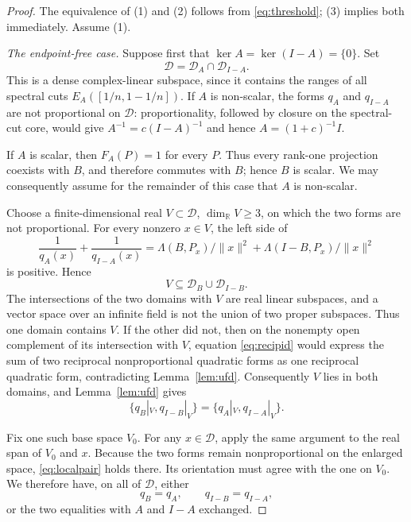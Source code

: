 \documentclass[11pt]{article}
\begin{document}
\begin{proof}
The equivalence of (1) and (2) follows from \eqref{eq:threshold}; (3) implies both immediately.  Assume (1).

\smallskip
\noindent\emph{The endpoint-free case.}
Suppose first that $\ker A=\ker(I-A)=\{0\}$.  Set
\[
 \mathcal D=\mathcal D_A\cap\mathcal D_{I-A}.
\]
This is a dense complex-linear subspace, since it contains the ranges of all spectral cuts $E_A([1/n,1-1/n])$.  If $A$ is non-scalar, the forms $q_A$ and $q_{I-A}$ are not proportional on $\mathcal D$: proportionality, followed by closure on the spectral-cut core, would give $A^{-1}=c(I-A)^{-1}$ and hence $A=(1+c)^{-1}I$.

If $A$ is scalar, then $F_A(P)=1$ for every $P$.  Thus every rank-one projection coexists with $B$, and therefore commutes with $B$; hence $B$ is scalar.  We may consequently assume for the remainder of this case that $A$ is non-scalar.

Choose a finite-dimensional real $V\subset\mathcal D$, $\dim_{\mathbb R}V\ge3$, on which the two forms are not proportional.  For every nonzero $x\in V$, the left side of
\begin{equation}\label{eq:recipid}
 \frac1{q_A(x)}+\frac1{q_{I-A}(x)}
 =\Lambda(B,P_x)/\|x\|^2+\Lambda(I-B,P_x)/\|x\|^2
\end{equation}
is positive.  Hence
\[
 V\subseteq\mathcal D_B\cup\mathcal D_{I-B}.
\]
The intersections of the two domains with $V$ are real linear subspaces, and a vector space over an infinite field is not the union of two proper subspaces.  Thus one domain contains $V$.  If the other did not, then on the nonempty open complement of its intersection with $V$, equation \eqref{eq:recipid} would express the sum of two reciprocal nonproportional quadratic forms as one reciprocal quadratic form, contradicting Lemma~\ref{lem:ufd}.  Consequently $V$ lies in both domains, and Lemma~\ref{lem:ufd} gives
\begin{equation}\label{eq:localpair}
 \{q_B|_V,q_{I-B}|_V\}=\{q_A|_V,q_{I-A}|_V\}.
\end{equation}

Fix one such base space $V_0$.  For any $x\in\mathcal D$, apply the same argument to the real span of $V_0$ and $x$.  Because the two forms remain nonproportional on the enlarged space, \eqref{eq:localpair} holds there.  Its orientation must agree with the one on $V_0$.  We therefore have, on all of $\mathcal D$, either
\begin{equation}\label{eq:directforms}
 q_B=q_A,\qquad q_{I-B}=q_{I-A},
\end{equation}
or the two equalities with $A$ and $I-A$ exchanged.


\end{proof}
\end{document}

